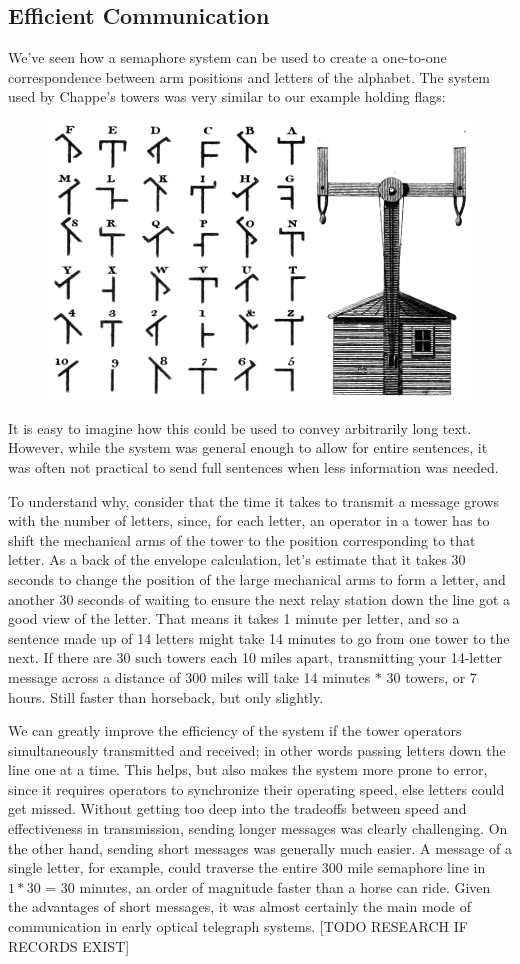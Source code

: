 \documentclass[UTF8]{book}
\begin{document}
\begin{CJK}{UTF8}{gbsn}
\section{Efficient Communication}

We've seen how a semaphore system can be used to create a one-to-one correspondence between arm positions and letters of the alphabet. The system used by Chappe's towers was very similar to our example holding flags:

\begin{figure}[H]
\centering
\includegraphics[width=0.5\linewidth]{chappe_telegraph_system}
\end{figure}

It is easy to imagine how this could be used to convey arbitrarily long text. However, while the system was general enough to allow for entire sentences, it was often not practical to send full sentences when less information was needed.

To understand why, consider that the time it takes to transmit a message grows with the number of letters, since, for each letter, an operator in a tower has to shift the mechanical arms of the tower to the position corresponding to that letter. As a back of the envelope calculation, let's estimate that it takes 30 seconds to change the position of the large mechanical arms to form a letter, and another 30 seconds of waiting to ensure the next relay station down the line got a good view of the letter. That means it takes 1 minute per letter, and so a sentence made up of 14 letters might take 14 minutes to go from one tower to the next. If there are 30 such towers each 10 miles apart, transmitting your 14-letter message across a distance of 300 miles will take 14 minutes $*$ 30 towers, or 7 hours. Still faster than horseback, but only slightly.

We can greatly improve the efficiency of the system if the tower operators simultaneously transmitted and received; in other words passing letters down the line one at a time. This helps, but also makes the system more prone to error, since it requires operators to synchronize their operating speed, else letters could get missed. Without getting too deep into the tradeoffs between speed and effectiveness in transmission, sending longer messages was clearly challenging. On the other hand, sending short messages was generally much easier. A message of a single letter, for example, could traverse the entire 300 mile semaphore line in $1 * 30$ = 30 minutes, an order of magnitude faster than a horse can ride. Given the advantages of short messages, it was almost certainly the main mode of communication in early optical telegraph systems. [TODO RESEARCH IF RECORDS EXIST]


\end{CJK}
\end{document}
